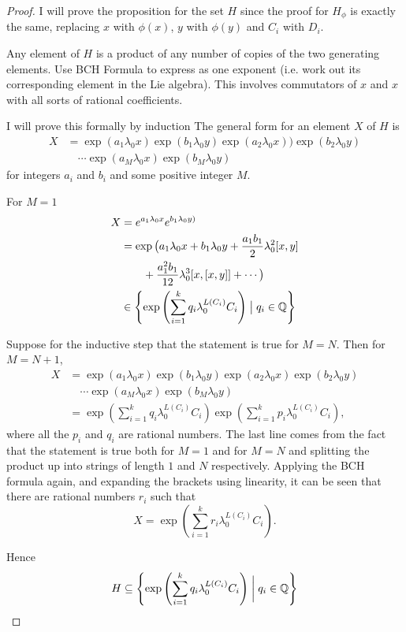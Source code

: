 \documentclass[honours]{UNSWthesis}
\newcommand{\Q}{\mathbb{Q}}
\newcommand{\1}{\mathbf{e}_{1}}
\newcommand{\2}{\mathbf{e}_{3}}
\newcommand{\3}{\mathbf{e}_{3}}
\begin{document}
\begin{proof}
I will prove the proposition for the set $H$ since the proof for $H_{\phi}$ is exactly the same, replacing $x$ with $\phi(x)$, $y$ with $\phi(y)$ and $C_i$ with $D_i$.

Any element of $H$ is a product of any number of copies of the two generating elements. Use BCH Formula to express as one exponent (i.e. work out its corresponding element in the Lie algebra). This involves commutators of $x$ and $x$ with all sorts of rational coefficients.

I will prove this formally by induction
The general form for an element $X$ of $H$ is
\begin{align*}
X &= \exp{(a_1 \lambda_0 x)}\exp{(b_1 \lambda_0 y)}\exp{(a_2 \lambda_0 x))}\exp{(b_2 \lambda_0 y)} \\
& \quad \cdots \exp{(a_M \lambda_0 x)}\exp{(b_M \lambda_0 y)}
\end{align*}
for integers $a_i$ and $b_i$ and some positive integer $M$. 

For $M=1$
\begin{align*}
X&= e^{a_1 \lambda_0 x}e^{b_1 \lambda_0 y)} \\
&= \exp \big( a_1 \lambda_0 x+b_1 \lambda_0 y+ \frac{a_1 b_1}{2}\lambda_0^2[ x, y]\\
& \quad \quad + \frac{a_1^2 b_1}{12}\lambda_0^3[x,[x,y]]+\cdots \big) \\
&\in \left\lbrace \exp \left( \sum\limits_{i=1}^{k} q_{i}\lambda_{0}^{L(C_{i})}C_{i} \right)\bigm| q_i \in \Q \right\rbrace 
\end{align*}

Suppose for the inductive step that the statement is true for $M=N$. Then for $M=N+1$, 
\begin{align*}
X &= \exp{(a_1 \lambda_0 x)}\exp{(b_1 \lambda_0 y)}\exp{(a_2 \lambda_0 x)}\exp{(b_2 \lambda_0 y)} \\
& \quad \cdots \exp{(a_M \lambda_0 x)}\exp{(b_M \lambda_0 y)} \\
&= \exp \left( \sum\limits_{i=1}^{k} q_{i}\lambda_{0}^{L(C_{i})}C_{i} \right) \exp \left( \sum\limits_{i=1}^{k} p_{i}\lambda_{0}^{L(C_{i})}C_{i} \right),
\end{align*}
where all the $p_i$ and $q_i$ are rational numbers. 
The last line comes from the fact that the statement is true both for $M=1$ and for $M=N$ and splitting the product up into strings of length $1$ and $N$ respectively. Applying the BCH formula again, and expanding the brackets using linearity, it can be seen that there are rational numbers $r_i$ such that 
\[
X=\exp \left( \sum\limits_{i=1}^{k} r_{i}\lambda_{0}^{L(C_{i})}C_{i} \right).
\]

Hence
\[
H \subseteq \left\lbrace \exp \left( \sum\limits_{i=1}^{k} q_{i}\lambda_{0}^{L(C_{i})}C_{i} \right) \biggm| q_{i} \in \Q \right\rbrace
\]
\end{proof}
\end{document}
